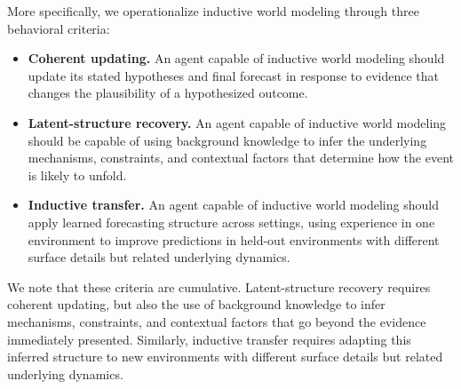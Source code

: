 \documentclass{article} %
\begin{document}
More specifically, we operationalize inductive world modeling through three behavioral criteria:

\begin{itemize}[nosep,leftmargin=*]
    \item[C1] \textbf{Coherent updating.}
An agent capable of inductive world modeling should update its stated hypotheses and final forecast in response to evidence that changes the plausibility of a hypothesized outcome. %

\item[C2] \textbf{Latent-structure recovery.} An agent capable of inductive world modeling should be capable of using background knowledge to infer the underlying mechanisms, constraints, and contextual factors that determine how the event is likely to unfold.

\item[C3] \textbf{Inductive transfer.} An agent capable of inductive world modeling should apply learned forecasting structure across settings, using experience in one environment to improve predictions in held-out environments with different surface details but related underlying dynamics.

\end{itemize}

We note that these criteria are cumulative. Latent-structure recovery requires coherent updating, but also the use of background knowledge to infer mechanisms, constraints, and contextual factors that go beyond the evidence immediately presented. Similarly, inductive transfer requires adapting this inferred structure to new environments with different surface details but related underlying dynamics.




\end{document}
